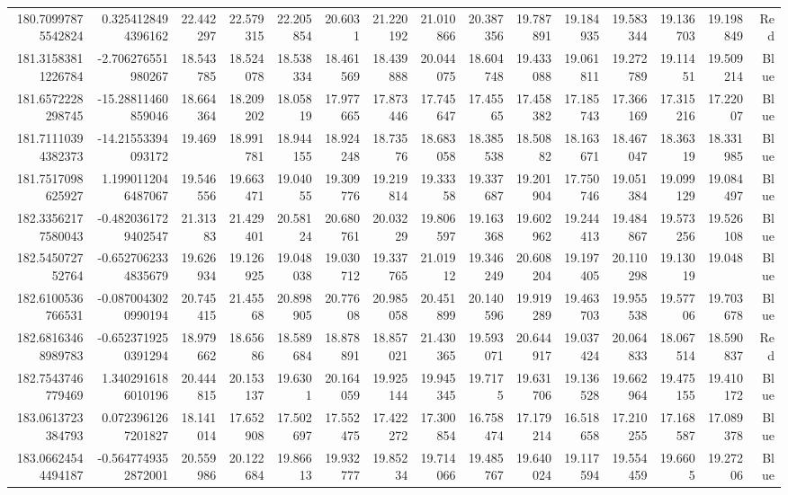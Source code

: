 \begin{center}
\begin{longtable}{rrrrrrrrrrrrrrr}
180.70997875542824 & 0.3254128494396162 & 22.442297 & 22.579315 & 22.205854 & 20.6031 & 21.220192 & 21.010866 & 20.387356 & 19.787891 & 19.184935 & 19.583344 & 19.136703 & 19.198849 & Red \\
181.31583811226784 & -2.706276551980267 & 18.543785 & 18.524078 & 18.538334 & 18.461569 & 18.439888 & 20.044075 & 18.604748 & 19.433088 & 19.061811 & 19.272789 & 19.11451 & 19.509214 & Blue \\
181.6572228298745 & -15.28811460859046 & 18.664364 & 18.209202 & 18.05819 & 17.977665 & 17.873446 & 17.745647 & 17.45565 & 17.458382 & 17.185743 & 17.366169 & 17.315216 & 17.22007 & Blue \\
181.71110394382373 & -14.21553394093172 & 19.469 & 18.991781 & 18.944155 & 18.924248 & 18.73576 & 18.683058 & 18.385538 & 18.50882 & 18.163671 & 18.467047 & 18.36319 & 18.331985 & Blue \\
181.7517098625927 & 1.1990112046487067 & 19.546556 & 19.663471 & 19.04055 & 19.309776 & 19.219814 & 19.33358 & 19.337687 & 19.201904 & 17.750746 & 19.051384 & 19.099129 & 19.084497 & Blue \\
182.33562177580043 & -0.4820361729402547 & 21.31383 & 21.429401 & 20.58124 & 20.680761 & 20.03229 & 19.806597 & 19.163368 & 19.602962 & 19.244413 & 19.484867 & 19.573256 & 19.526108 & Blue \\
182.545072752764 & -0.6527062334835679 & 19.626934 & 19.126925 & 19.048038 & 19.030712 & 19.337765 & 21.01912 & 19.346249 & 20.608204 & 19.197405 & 20.110298 & 19.13019 & 19.048 & Blue \\
182.6100536766531 & -0.0870043020990194 & 20.745415 & 21.45568 & 20.898905 & 20.77608 & 20.985058 & 20.451899 & 20.140596 & 19.919289 & 19.463703 & 19.955538 & 19.57706 & 19.703678 & Blue \\
182.68163468989783 & -0.6523719250391294 & 18.979662 & 18.65686 & 18.589684 & 18.878891 & 18.857021 & 21.430365 & 19.593071 & 20.644917 & 19.037424 & 20.064833 & 18.067514 & 18.590837 & Red \\
182.7543746779469 & 1.3402916186010196 & 20.444815 & 20.153137 & 19.6301 & 20.164059 & 19.925144 & 19.945345 & 19.7175 & 19.631706 & 19.136528 & 19.662964 & 19.475155 & 19.410172 & Blue \\
183.0613723384793 & 0.0723961267201827 & 18.141014 & 17.652908 & 17.502697 & 17.552475 & 17.422272 & 17.300854 & 16.758474 & 17.179214 & 16.518658 & 17.210255 & 17.168587 & 17.089378 & Blue \\
183.06624544494187 & -0.5647749352872001 & 20.559986 & 20.122684 & 19.86613 & 19.932777 & 19.85234 & 19.714066 & 19.485767 & 19.640024 & 19.117594 & 19.554459 & 19.6605 & 19.27206 & Blue \\

\end{longtable}
\end{center}
